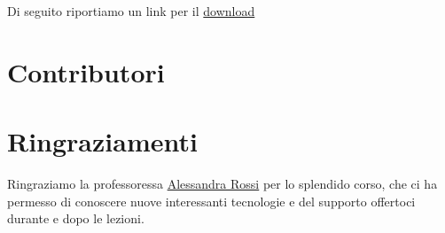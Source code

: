\documentclass[letterpaper, 11pt]{article}
\begin{document}
Di seguito riportiamo un link per il \href{https://github.com/luftmensch-luftmensch/InfoPoint/}{download} \autocite{informazioniRepository}
\section{Contributori}
\label{Contributori}
\section{Ringraziamenti}
\label{Ringraziamenti}
Ringraziamo la professoressa \href{mailto:alessandra.rossi@unina.it}{Alessandra Rossi} per lo splendido corso, che ci ha permesso di conoscere nuove interessanti tecnologie e del supporto offertoci durante e dopo le lezioni.
\end{document}
